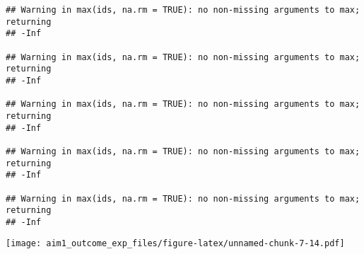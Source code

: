 \documentclass[
]{article}
\begin{document}
\begin{verbatim}
## Warning in max(ids, na.rm = TRUE): no non-missing arguments to max; returning
## -Inf

## Warning in max(ids, na.rm = TRUE): no non-missing arguments to max; returning
## -Inf

## Warning in max(ids, na.rm = TRUE): no non-missing arguments to max; returning
## -Inf

## Warning in max(ids, na.rm = TRUE): no non-missing arguments to max; returning
## -Inf

## Warning in max(ids, na.rm = TRUE): no non-missing arguments to max; returning
## -Inf
\end{verbatim}

\texttt{[image: aim1\_outcome\_exp\_files/figure-latex/unnamed-chunk-7-14.pdf]}
\end{document}
